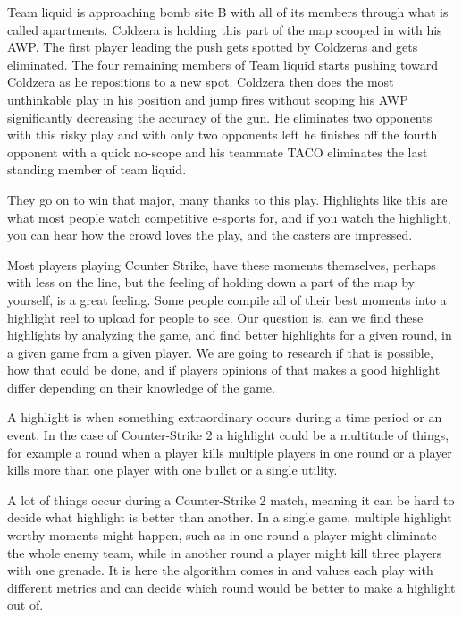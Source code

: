 Team liquid is approaching bomb site B with all of its members through what is called apartments. Coldzera is holding this part of the map scooped in with his AWP. The first player leading the push gets spotted by Coldzeras and gets eliminated. The four remaining members of Team liquid starts pushing toward Coldzera as he repositions to a new spot. Coldzera then does the most unthinkable play in his position and jump fires without scoping his AWP significantly decreasing the accuracy of the gun. He eliminates two opponents with this risky play and with only two opponents left he finishes off the fourth opponent with a quick no-scope and his teammate TACO eliminates the last standing member of team liquid.


They go on to win that major, many thanks to this play. Highlights like this are what most people watch competitive e-sports for, and if you watch the highlight, you can hear how the crowd loves the play, and the casters are impressed.
 
Most players playing Counter Strike, have these moments themselves, perhaps with less on the line, but the feeling of holding down a part of the map by yourself, is a great feeling. Some people compile all of their best moments into a highlight reel to upload for people to see. Our question is, can we find these highlights by analyzing the game, and find better highlights for a given round, in a given game from a given player. We are going to research if that is possible, how that could be done, and if players opinions of that makes a good highlight differ depending on their knowledge of the game.


A highlight is when something extraordinary occurs during a time period or an event. In the case of Counter-Strike 2 a highlight could be a multitude of things, for example a round when a player kills multiple players in one round or a player kills more than one player with one bullet or a single utility. 


A lot of things occur during a Counter-Strike 2 match, meaning it can be hard to decide what highlight is better than another. In a single game, multiple highlight worthy moments might happen, such as in one round a player might eliminate the whole enemy team, while in another round a player might kill three players with one grenade. It is here the algorithm comes in and values each play with different metrics and can decide which round would be better to make a highlight out of.


